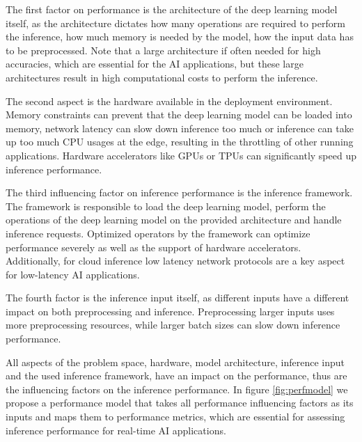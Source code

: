 The first factor on performance is the architecture of the deep learning model itself, as the architecture dictates how many operations are required to perform the inference, how much memory is needed by the model, how the input data has to be preprocessed.
Note that a large architecture if often needed for high accuracies, which are essential for the AI applications, but these large architectures result in high computational costs to perform the inference.

The second aspect is the hardware available in the deployment environment. 
Memory constraints can prevent that the deep learning model can be loaded into memory, network latency can slow down inference too much or inference can take up too much CPU usages at the edge, resulting in the throttling of other running applications.
Hardware accelerators like GPUs or TPUs can significantly speed up inference performance.

The third influencing factor on inference performance is the inference framework. 
The framework is responsible to load the deep learning model, perform the operations of the deep learning model on the provided architecture and handle inference requests.
Optimized operators by the framework can optimize performance severely as well as the support of hardware accelerators.
Additionally, for cloud inference low latency network protocols are a key aspect for low-latency AI applications.

The fourth factor is the inference input itself, as different inputs have a different impact on both preprocessing and inference. 
Preprocessing larger inputs uses more preprocessing resources, while larger batch sizes can slow down inference performance.

All aspects of the problem space, hardware, model architecture, inference input and the used inference framework, have an impact on the performance, thus are the influencing factors on the inference performance.
In figure \ref{fig:perfmodel} we propose a performance model that takes all performance influencing factors as its inputs and maps them to performance metrics, which are essential for assessing inference performance for real-time AI applications.

